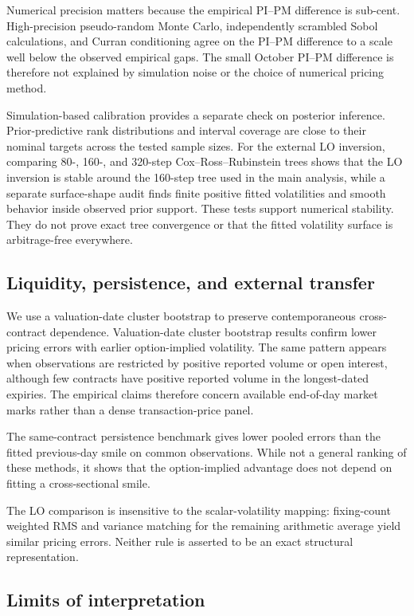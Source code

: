 Numerical precision matters because the empirical PI--PM difference is sub-cent. High-precision pseudo-random Monte Carlo, independently scrambled Sobol calculations, and Curran conditioning agree on the PI--PM difference to a scale well below the observed empirical gaps. The small October PI--PM difference is therefore not explained by simulation noise or the choice of numerical pricing method.

Simulation-based calibration provides a separate check on posterior inference. Prior-predictive rank distributions and interval coverage are close to their nominal targets across the tested sample sizes. For the external LO inversion, comparing 80-, 160-, and 320-step Cox--Ross--Rubinstein trees shows that the LO inversion is stable around the 160-step tree used in the main analysis, while a separate surface-shape audit finds finite positive fitted volatilities and smooth behavior inside observed prior support. These tests support numerical stability. They do not prove exact tree convergence or that the fitted volatility surface is arbitrage-free everywhere.

\subsection{Liquidity, persistence, and external transfer}

We use a valuation-date cluster bootstrap to preserve contemporaneous cross-contract dependence. Valuation-date cluster bootstrap results confirm lower pricing errors with earlier option-implied volatility. The same pattern appears when observations are restricted by positive reported volume or open interest, although few contracts have positive reported volume in the longest-dated expiries. The empirical claims therefore concern available end-of-day market marks rather than a dense transaction-price panel.

The same-contract persistence benchmark gives lower pooled errors than the fitted previous-day smile on common observations. While not a general ranking of these methods, it shows that the option-implied advantage does not depend on fitting a cross-sectional smile.

The LO comparison is insensitive to the scalar-volatility mapping: fixing-count weighted RMS and variance matching for the remaining arithmetic average yield similar pricing errors. Neither rule is asserted to be an exact structural representation.

\subsection{Limits of interpretation}


